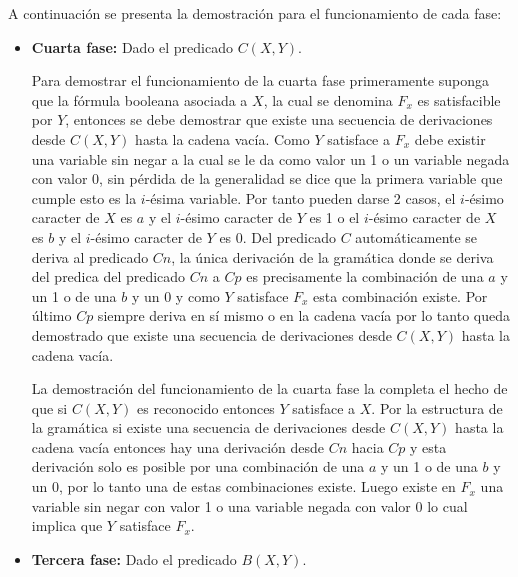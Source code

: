 A continuación se presenta la demostración para el funcionamiento de cada fase:

\begin{itemize}
    \item \textbf{Cuarta fase:} Dado el predicado $C(X,Y)$.

          Para demostrar el funcionamiento de la cuarta fase primeramente suponga que la fórmula booleana asociada a $X$, la
          cual se denomina $F_x$ es satisfacible por $Y$, entonces se debe demostrar que existe una secuencia de
          derivaciones desde $C(X,Y)$ hasta la cadena vacía. Como $Y$ satisface a $F_x$ debe existir una variable sin negar a
          la cual se le da como valor un 1 o un variable negada con valor 0, sin pérdida de la generalidad se dice que
          la primera variable que cumple esto es la $i$-ésima variable. Por tanto pueden darse 2 casos, el $i$-ésimo caracter de $X$ es $a$ y el $i$-ésimo caracter de
          $Y$ es 1 o el $i$-ésimo caracter de $X$ es $b$ y el $i$-ésimo caracter de $Y$ es 0. Del predicado $C$ automáticamente
          se deriva al predicado $Cn$, la única derivación de la gramática donde se deriva del predica del predicado $Cn$ a $Cp$
          es precisamente la combinación de una $a$ y un 1 o de una $b$ y un 0 y como $Y$ satisface $F_x$ esta combinación existe. Por último
          $Cp$ siempre deriva en sí mismo o en la cadena vacía por lo tanto queda demostrado que existe una secuencia de derivaciones
          desde $C(X,Y)$ hasta la cadena vacía.

          La demostración del funcionamiento de la cuarta fase la completa el hecho de que si $C(X,Y)$ es reconocido entonces
          $Y$ satisface a $X$. Por la estructura de la gramática si existe una secuencia de derivaciones desde $C(X,Y)$ hasta la cadena
          vacía entonces hay una derivación desde $Cn$ hacia $Cp$ y esta derivación solo es posible por una combinación de una $a$ y un 1
          o de una $b$ y un 0, por lo tanto una de estas combinaciones existe. Luego existe en $F_x$ una variable sin negar con valor 1 o una variable
          negada con valor 0 lo cual implica que $Y$ satisface $F_x$.

    \item \textbf{Tercera fase:} Dado el predicado $B(X,Y)$.


\end{itemize}
